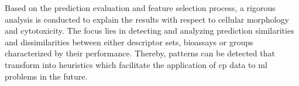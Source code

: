 Based on the prediction evaluation and feature selection process, a rigorous analysis is conducted to explain the results with respect to cellular morphology and cytotoxicity. The focus lies in detecting and analyzing prediction similarities and dissimilarities between either descriptor sets, bioassays or groups characterized by their performance. Thereby, patterns can be detected that transform into heuristics which facilitate the application of \ac{cp} data to \ac{ml} problems in the future.